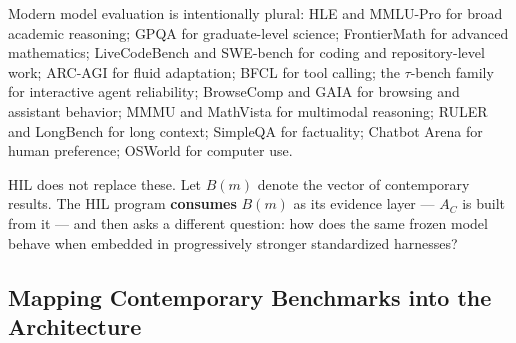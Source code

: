 \documentclass[11pt]{article}
\theoremstyle{definition}
\begin{document}
Modern model evaluation is intentionally plural: HLE \citep{phan2025hle} and MMLU-Pro \citep{wang2024mmlupro} for broad academic reasoning; GPQA \citep{rein2023gpqa} for graduate-level science; FrontierMath \citep{glazer2024frontiermath} for advanced mathematics; LiveCodeBench \citep{jain2024livecodebench} and SWE-bench \citep{jimenez2023swebench} for coding and repository-level work; ARC-AGI \citep{arc2026} for fluid adaptation; BFCL \citep{patil2025bfcl} for tool calling; the $\tau$-bench family \citep{yao2024taubench} for interactive agent reliability; BrowseComp \citep{wei2025browsecomp} and GAIA \citep{mialon2023gaia} for browsing and assistant behavior; MMMU \citep{yue2023mmmu} and MathVista \citep{lu2023mathvista} for multimodal reasoning; RULER \citep{hsieh2024ruler} and LongBench \citep{bai2024longbench} for long context; SimpleQA \citep{openai2024simpleqa} for factuality; Chatbot Arena \citep{chiang2024arena} for human preference; OSWorld \citep{xie2024osworld} for computer use.

HIL does not replace these. Let $B(m)$ denote the vector of contemporary results. The HIL program \textbf{consumes} $B(m)$ as its evidence layer --- $A_C$ is built from it --- and then asks a different question: how does the same frozen model behave when embedded in progressively stronger standardized harnesses?

\subsection{Mapping Contemporary Benchmarks into the Architecture}
\end{document}
